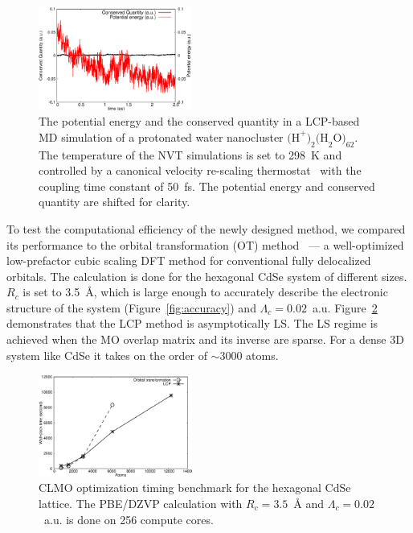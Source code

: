 \documentclass[10pt,amsmath,twocolumn,aps,prl,superscriptaddress,floatfix]{revtex4-1}
\begin{document}
\begin{figure}
\includegraphics[width=0.45\textwidth]{const.eps}
\caption{The potential energy and the conserved quantity in a LCP-based MD simulation of a protonated water nanocluster $\text{(H}^{+}\text{)}_2\text{(H}_2\text{O)}_{62}$. The temperature of the NVT simulations is set to 298~K and controlled by a canonical velocity re-scaling thermostat~\cite{bussi2007canonical} with the coupling time constant of 50~fs. The potential energy and conserved quantity are shifted for clarity.}
\label{fig:md}
\end{figure}



To test the computational efficiency of the newly designed method, we compared its performance to the orbital transformation (OT) method~\cite{weber2008direct,vandevondele2003efficient} --- a well-optimized low-prefactor cubic scaling DFT method for conventional fully delocalized orbitals. The calculation is done for the hexagonal CdSe system of different sizes. $R_c$ is set to 3.5~{\AA}, which is large enough to accurately describe the electronic structure of the system (Figure~\ref{fig:accuracy}) and $\Lambda_c = 0.02$~a.u. Figure~\ref{fig:scaling} demonstrates that the LCP method is asymptotically LS. The LS regime is achieved when the MO overlap matrix and its inverse are sparse. For a dense 3D system like CdSe it takes on the order of $\sim$3000 atoms. 

\begin{figure}
\centering
\includegraphics[width=0.45\textwidth]{timing}
\caption{CLMO optimization timing benchmark for the hexagonal CdSe lattice. The PBE/DZVP calculation with $R_c=3.5$~{\AA} and $\Lambda_c = 0.02$~a.u. is done on 256 compute cores. 
}
\label{fig:scaling}
\end{figure}
\end{document}
